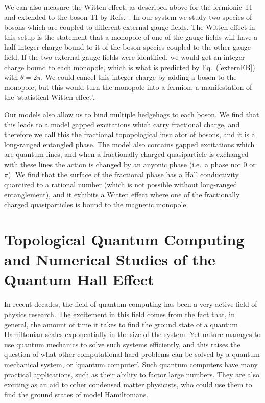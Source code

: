 We can also measure the Witten effect, as described above for the fermionic TI and extended to the boson TI by Refs.~\cite{Max,MaxWitten}. In our system we study two species of bosons which are coupled to different external gauge fields. The Witten effect in this setup is the statement that a monopole of one of the gauge fields will have a half-integer charge bound to it of the boson species coupled to the other gauge field. If the two external gauge fields were identified, we would get an integer charge bound to each monopole, which is what is predicted by Eq.~(\ref{externEB}) with $\theta=2\pi$. We could cancel this integer charge by adding a boson to the monopole, but this would turn the monopole into a fermion, a manifestation of the `statistical Witten effect'\cite{Max,MaxWitten}.

Our models also allow us to bind multiple hedgehogs to each boson. We find that this leads to a model gapped excitations which carry fractional charge, and therefore we call this the fractional topopological insulator of bosons, and it is a long-ranged entangled phase. The model also contains gapped excitations which are quantum lines, and when a fractionally charged quasiparticle is exchanged with these lines the action is changed by an anyonic phase (i.e.~a phase not $0$ or $\pi$). We find that the surface of the fractional phase has a Hall conductivity quantized to a rational number (which is not possible without long-ranged entanglement), and it exhibits a Witten effect where one of the fractionally charged quasiparticles is bound to the magnetic monopole.

\section{Topological Quantum Computing and Numerical Studies of the Quantum Hall Effect}

In recent decades, the field of quantum computing has been a very active field of physics research. The excitement in this field comes from the fact that, in general, the amount of time it takes to find the ground state of a quantum Hamiltonian scales exponentially in the size of the system. Yet nature manages to use quantum mechanics to solve such systems efficiently, and this raises the question of what other computational hard problems can be solved by a quantum mechanical system, or `quantum computer'. Such quantum computers have many practical applications, such as their ability to factor large numbers. They are also exciting as an aid to other condensed matter physicists, who could use them to find the ground states of model Hamiltonians.

